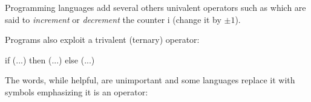 Programming languages add several others univalent operators
such as  which are said to \emph{increment} 
or \emph{decrement} the counter i (change it by $\pm 1$).

Programs also exploit a trivalent (ternary) operator:
\begin{center}
\begin{Pcode}[]
if (...) then (...) else (...)
\end{Pcode}
\end{center}
The words, while helpful, are unimportant and some languages
replace it with symbols emphasizing it is an operator:
\begin{center}
\end{center}
